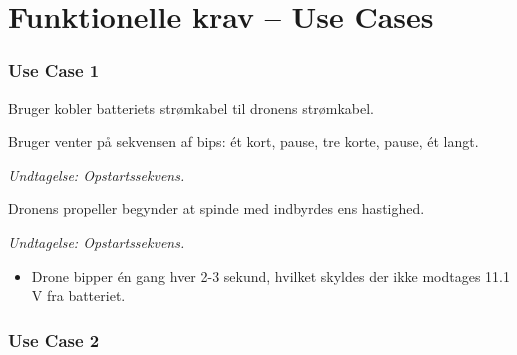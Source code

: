 \documentclass[Main]{subfiles}
\begin{document}
\chapter{Funktionelle krav -- Use Cases}


\subsection{Use Case 1}

\begin{UseCase}

	\begin{normFor}
	\item Bruger kobler batteriets strømkabel til dronens strømkabel.
	\item Bruger venter på sekvensen af bips: ét kort, pause, tre korte, pause, ét langt.
	\item[]	\textit{Undtagelse: Opstartssekvens.}
	\item Dronens propeller begynder at spinde med indbyrdes ens hastighed.
	\end{normFor} 

	\begin{normFor}
	\item \textit{Undtagelse: Opstartssekvens.}
	\begin{itemize}
	\item Drone bipper én gang hver 2-3 sekund, hvilket skyldes der ikke modtages 11.1 V fra batteriet.
	\end{itemize}
	\end{normFor} 
\end{UseCase}



\subsection{Use Case 2}
\end{document}
